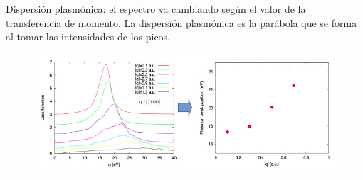   Dispersión plasmónica: el espectro va cambiando según el valor de la transferencia de momento. La dispersión plasmónica es la parábola que se forma al tomar las intensidades de los picos.
    \begin{figure}[H]
        \centering
        \includegraphics[scale = 0.65]{figs/D6/disp.png}
    \end{figure}
